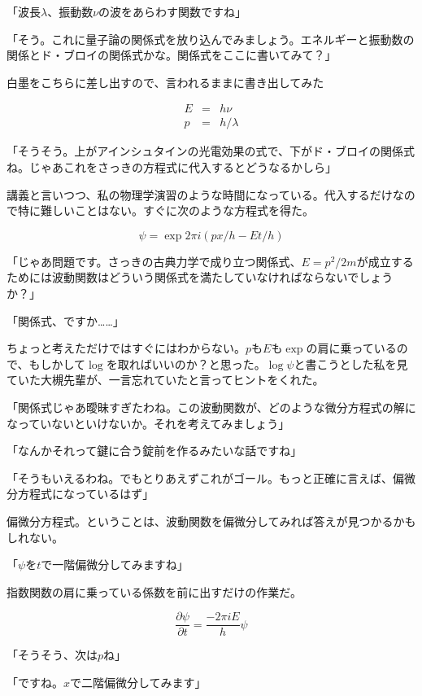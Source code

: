 \documentclass[a4paper,dvipdfmx,12pt]{jsarticle}
\begin{document}
「波長$\lambda$、振動数$\nu$の波をあらわす関数ですね」

「そう。これに量子論の関係式を放り込んでみましょう。エネルギーと振動数の関係とド・ブロイの関係式かな。関係式をここに書いてみて？」

白墨をこちらに差し出すので、言われるままに書き出してみた

\begin{eqnarray}
E&=&h \nu \\
p&=&h/\lambda
\end{eqnarray}

「そうそう。上がアインシュタインの光電効果の式で、下がド・ブロイの関係式ね。じゃあこれをさっきの方程式に代入するとどうなるかしら」

講義と言いつつ、私の物理学演習のような時間になっている。代入するだけなので特に難しいことはない。すぐに次のような方程式を得た。

\begin{equation}
\psi=\exp{2\pi i(px/h-Et/h)}
\end{equation}

「じゃあ問題です。さっきの古典力学で成り立つ関係式、$E=p^2/2m$が成立するためには波動関数はどういう関係式を満たしていなければならないでしょうか？」

「関係式、ですか……」

ちょっと考えただけではすぐにはわからない。$p$も$E$も$\exp$の肩に乗っているので、もしかして$\log$を取ればいいのか？と思った。$\log\psi$と書こうとした私を見ていた大槻先輩が、一言忘れていたと言ってヒントをくれた。

「関係式じゃあ曖昧すぎたわね。この波動関数が、どのような微分方程式の解になっていないといけないか。それを考えてみましょう」

「なんかそれって鍵に合う錠前を作るみたいな話ですね」


「そうもいえるわね。でもとりあえずこれがゴール。もっと正確に言えば、偏微分方程式になっているはず」

偏微分方程式。ということは、波動関数を偏微分してみれば答えが見つかるかもしれない。

「$\psi$を$t$で一階偏微分してみますね」

指数関数の肩に乗っている係数を前に出すだけの作業だ。

\begin{equation}
\frac{\partial\psi}{\partial t} = \frac{-2\pi iE}{h} \psi
\end{equation}

「そうそう、次は$p$ね」

「ですね。$x$で二階偏微分してみます」
\end{document}
